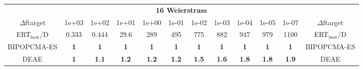 \begin{tabular}{cccccccccccc}
 & \multicolumn{10}{c}{{\normalsize \textbf{16 Weierstrass}}}\\
$\Delta$ftarget& 1e+03& 1e+02& 1e+01& 1e+00& 1e-01& 1e-02& 1e-03& 1e-04& 1e-05& 1e-07 & $\Delta$ftarget \\
ERT$_{\textrm{best}}$/D& 0.333& 0.444& 29.6& 289& 495& 775& 882& 947& 979& 1100 & ERT$_{\textrm{best}}$/D \\
\hline
BIPOPCMA-ES & \textbf{1} & \textbf{1} & \textbf{1} & \textbf{1} & \textbf{1} & \textbf{1} & \textbf{1} & \textbf{1} & \textbf{1} & \textbf{1} & BIPOPCMA-ES \cite{add_an_entry_for_BIPOPCMA-ES_in_bbob.bib}\\
DEAE & \textbf{1} & \textbf{1.1} & \textbf{1.2} & \textbf{1.2} & \textbf{1.2} & \textbf{1.5} & \textbf{1.6} & \textbf{1.8} & \textbf{1.8} & \textbf{1.9} & DEAE \cite{add_an_entry_for_DEAE_in_bbob.bib}
\end{tabular}
